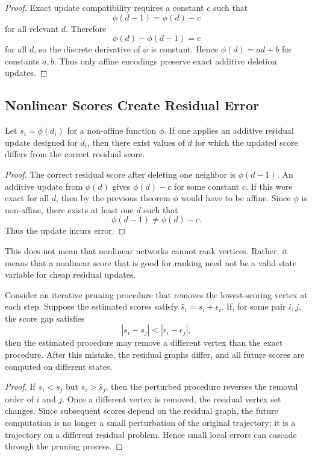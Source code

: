 \begin{proof}
  Exact update compatibility requires a constant $c$ such that
  \[
    \phi(d-1)=\phi(d)-c
  \]
  for all relevant $d$. Therefore
  \[
    \phi(d)-\phi(d-1)=c
  \]
  for all $d$, so the discrete derivative of $\phi$ is constant. Hence $\phi(d)=ad+b$ for constants $a,b$. Thus only affine encodings preserve exact additive deletion updates.
\end{proof}

\subsection{Nonlinear Scores Create Residual Error}

\begin{theorem}
  Let $s_i=\phi(d_i)$ for a non-affine function $\phi$. If one applies an additive residual update designed for $d_i$, then there exist values of $d$ for which the updated score differs from the correct residual score.
\end{theorem}

\begin{proof}
  The correct residual score after deleting one neighbor is $\phi(d-1)$. An additive update from $\phi(d)$ gives $\phi(d)-c$ for some constant $c$. If this were exact for all $d$, then by the previous theorem $\phi$ would have to be affine. Since $\phi$ is non-affine, there exists at least one $d$ such that
  \[
    \phi(d-1) \ne \phi(d)-c .
  \]
  Thus the update incurs error.
\end{proof}

This does not mean that nonlinear networks cannot rank vertices. Rather, it means that a nonlinear score that is good for ranking need not be a valid state variable for cheap residual updates.

\begin{theorem}
  Consider an iterative pruning procedure that removes the lowest-scoring vertex at each step. Suppose the estimated scores satisfy $\hat{s}_i=s_i+\epsilon_i$. If, for some pair $i,j$, the score gap satisfies
  \[
    |s_i-s_j| < |\epsilon_i-\epsilon_j|,
  \]
  then the estimated procedure may remove a different vertex than the exact procedure. After this mistake, the residual graphs differ, and all future scores are computed on different states.
\end{theorem}

\begin{proof}
  If $s_i<s_j$ but $\hat{s}_i>\hat{s}_j$, then the perturbed procedure reverses the removal order of $i$ and $j$. Once a different vertex is removed, the residual vertex set changes. Since subsequent scores depend on the residual graph, the future computation is no longer a small perturbation of the original trajectory; it is a trajectory on a different residual problem. Hence small local errors can cascade through the pruning process.
\end{proof}

